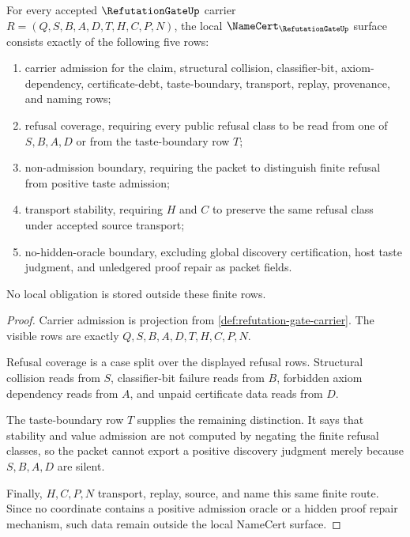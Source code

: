 \begin{theorem}
\label{thm:refutation-gate-namecert-obligations}
For every accepted $\RefutationGateUp$ carrier $R=(Q,S,B,A,D,T,H,C,P,N)$, the local $\NameCert_{\RefutationGateUp}$ surface consists exactly of the following five rows:
\begin{enumerate}
\item carrier admission for the claim, structural collision, classifier-bit, axiom-dependency, certificate-debt, taste-boundary, transport, replay, provenance, and naming rows;
\item refusal coverage, requiring every public refusal class to be read from one of $S,B,A,D$ or from the taste-boundary row $T$;
\item non-admission boundary, requiring the packet to distinguish finite refusal from positive taste admission;
\item transport stability, requiring $H$ and $C$ to preserve the same refusal class under accepted source transport;
\item no-hidden-oracle boundary, excluding global discovery certification, host taste judgment, and unledgered proof repair as packet fields.
\end{enumerate}
No local obligation is stored outside these finite rows.
\end{theorem}
\begin{proof}
Carrier admission is projection from \autoref{def:refutation-gate-carrier}. The visible rows are exactly $Q,S,B,A,D,T,H,C,P,N$.

Refusal coverage is a case split over the displayed refusal rows. Structural collision reads from $S$, classifier-bit failure reads from $B$, forbidden axiom dependency reads from $A$, and unpaid certificate data reads from $D$.

The taste-boundary row $T$ supplies the remaining distinction. It says that stability and value admission are not computed by negating the finite refusal classes, so the packet cannot export a positive discovery judgment merely because $S,B,A,D$ are silent.

Finally, $H,C,P,N$ transport, replay, source, and name this same finite route. Since no coordinate contains a positive admission oracle or a hidden proof repair mechanism, such data remain outside the local NameCert surface.
\end{proof}

